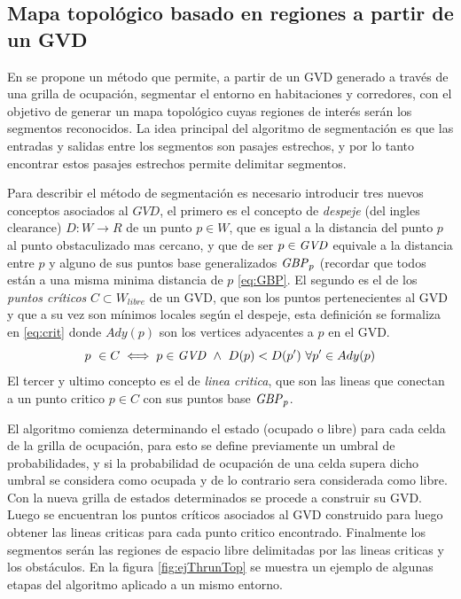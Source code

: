 \subsection{Mapa topológico basado en regiones a partir de un GVD}\label{subsec:mapaTopGVD}
En \cite{Thrun1998} se propone un método que permite, a partir de un GVD generado a través de una grilla de ocupación, segmentar el entorno en habitaciones y corredores, con el objetivo de generar un mapa topológico cuyas regiones de interés serán los segmentos reconocidos. La idea principal del algoritmo de segmentación es que las entradas y salidas entre los segmentos son pasajes estrechos, y por lo tanto encontrar estos pasajes estrechos permite delimitar segmentos.

Para describir el método de segmentación es necesario introducir tres nuevos conceptos asociados al $GVD$, el primero es el concepto de \emph{despeje} (del ingles clearance) $D : W \rightarrow R$ de un punto $p \in W$, que es igual a la distancia del punto $p$ al punto obstaculizado mas cercano, y que de ser $p \in \mathit{GVD}$ equivale a la distancia entre $p$ y alguno de sus puntos base generalizados $\mathit{GBP}_p$ (recordar que todos están a una misma minima distancia de $p$ \eqref{eq:GBP}. El segundo es el de los \emph{puntos críticos} $C \subset W_{libre}$ de un GVD, que son los puntos pertenecientes al GVD y que a su vez son mínimos locales según el despeje, esta definición se formaliza en \eqref{eq:crit} donde $Ady(p)$ son los vertices adyacentes a $p$ en el GVD. 
\begin{equation}
  p\ \in C \iff p \in \mli{GVD}\ \land \ D(p) < D(p')\ \forall p' \in Ady(p) \label{eq:crit}
\end{equation}
El tercer y ultimo concepto es el de \emph{linea critica}, que son las lineas que conectan a un punto critico $p \in C$ con sus puntos base $\mathit{GBP}_p$.

El algoritmo comienza determinando el estado (ocupado o libre) para cada celda de la grilla de ocupación, para esto se define previamente un umbral de probabilidades, y si la probabilidad de ocupación de una celda supera dicho umbral se considera como ocupada y de lo contrario sera considerada como libre. Con la nueva grilla de estados determinados se procede a construir su  GVD. Luego se encuentran los puntos críticos asociados al GVD construido para luego obtener las lineas criticas para cada punto critico encontrado. Finalmente los segmentos serán las regiones de espacio libre delimitadas por las lineas criticas y los obstáculos. En la figura \ref{fig:ejThrunTop} se muestra un ejemplo de algunas etapas del algoritmo aplicado a un mismo entorno.

